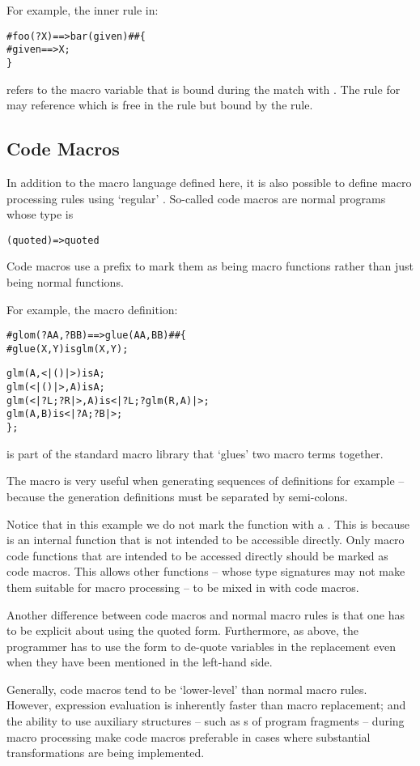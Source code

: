 For example, the inner rule in:
\begin{alltt}
# foo(?X) ==> bar(given) ## \{
  #given ==> X;
\}
\end{alltt}
refers to the macro variable  that is bound during the match with . The rule for  may reference  which is free in the  rule but bound by the  rule.

\subsection{Code Macros}
\label{codeMacros}
In addition to the macro language defined here, it is also possible to define macro processing rules using `regular' \Sr. So-called code macros are normal \Sr programs whose type is 
\begin{alltt}
(quoted)=>quoted
\end{alltt}
Code macros use a prefix \q{\#} to mark them as being macro functions rather than just being normal functions.

For example, the macro definition:
\begin{alltt}
\#glom(?AA,?BB) ==> glue(AA,BB) ## \{
    \#glue(X,Y) is glm(X,Y);
    
    glm(A,<|()|>) is A;
    glm(<|()|>,A) is A;
    glm(<|?L;?R|>,A) is <|?L;?glm(R,A)|>;
    glm(A,B) is <|?A;?B|>;
  \};
\end{alltt}
is part of the standard macro library that `glues' two macro terms together.
\begin{aside}
The  macro is very useful when generating sequences of definitions for example -- because the generation definitions must be separated by semi-colons.
\end{aside}
Notice that in this example we do not mark the  function with a \q{\#}. This is because  is an internal function that is not intended to be accessible directly. Only macro code functions that are intended to be accessed directly should be marked as code macros. This allows other functions -- whose type signatures may not make them suitable for macro processing -- to be mixed in with code macros.

Another difference between code macros and normal macro rules is that one has to be explicit about using the quoted form. Furthermore, as above, the programmer has to use the  form to de-quote variables in the replacement even when they have been mentioned in the left-hand side.

\begin{aside}
Generally, code macros tend to be `lower-level' than normal macro rules. However, expression evaluation is inherently faster than macro replacement; and the ability to use auxiliary structures -- such as s of program fragments -- during macro processing make code macros preferable in cases where substantial transformations are being implemented.
\end{aside}

